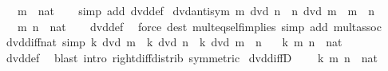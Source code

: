 \begin{isabellebody}
\ \ \ m\ {\isacharcolon}{\kern0pt}{\isacharcolon}{\kern0pt}\ nat\isanewline
%
\isadelimproof
\ \ %
\endisadelimproof
%
\isatagproof
{}\isamarkupfalse%
\ {\isacharparenleft}{\kern0pt}simp\ add{\isacharcolon}{\kern0pt}\ dvd{\isacharunderscore}{\kern0pt}def{\isacharparenright}{\kern0pt}%
\endisatagproof
{\isafoldproof}%
%
\isadelimproof
\isanewline
%
\endisadelimproof
\isanewline
{}\isamarkupfalse%
\ dvd{\isacharunderscore}{\kern0pt}antisym{\isacharcolon}{\kern0pt}\ {\isachardoublequoteopen}m\ dvd\ n\ {\isasymLongrightarrow}\ n\ dvd\ m\ {\isasymLongrightarrow}\ m\ {\isacharequal}{\kern0pt}\ n{\isachardoublequoteclose}\isanewline
\ \ \ m\ n\ {\isacharcolon}{\kern0pt}{\isacharcolon}{\kern0pt}\ nat\isanewline
%
\isadelimproof
\ \ %
\endisadelimproof
%
\isatagproof
{}\isamarkupfalse%
\ dvd{\isacharunderscore}{\kern0pt}def\ \isamarkupfalse%
\ {\isacharparenleft}{\kern0pt}force\ dest{\isacharcolon}{\kern0pt}\ mult{\isacharunderscore}{\kern0pt}eq{\isacharunderscore}{\kern0pt}self{\isacharunderscore}{\kern0pt}implies{\isacharunderscore}{\kern0pt}{}{}\ simp\ add{\isacharcolon}{\kern0pt}\ mult{\isachardot}{\kern0pt}assoc{\isacharparenright}{\kern0pt}%
\endisatagproof
{\isafoldproof}%
%
\isadelimproof
\isanewline
%
\endisadelimproof
\isanewline
{}\isamarkupfalse%
\ dvd{\isacharunderscore}{\kern0pt}diff{\isacharunderscore}{\kern0pt}nat\ {\isacharbrackleft}{\kern0pt}simp{\isacharbrackright}{\kern0pt}{\isacharcolon}{\kern0pt}\ {\isachardoublequoteopen}k\ dvd\ m\ {\isasymLongrightarrow}\ k\ dvd\ n\ {\isasymLongrightarrow}\ k\ dvd\ {\isacharparenleft}{\kern0pt}m\ {\isacharminus}{\kern0pt}\ n{\isacharparenright}{\kern0pt}{\isachardoublequoteclose}\isanewline
\ \ \ k\ m\ n\ {\isacharcolon}{\kern0pt}{\isacharcolon}{\kern0pt}\ nat\isanewline
%
\isadelimproof
\ \ %
\endisadelimproof
%
\isatagproof
{}\isamarkupfalse%
\ dvd{\isacharunderscore}{\kern0pt}def\ \isamarkupfalse%
\ {\isacharparenleft}{\kern0pt}blast\ intro{\isacharcolon}{\kern0pt}\ right{\isacharunderscore}{\kern0pt}diff{\isacharunderscore}{\kern0pt}distrib{\isacharprime}{\kern0pt}\ {\isacharbrackleft}{\kern0pt}symmetric{\isacharbrackright}{\kern0pt}{\isacharparenright}{\kern0pt}%
\endisatagproof
{\isafoldproof}%
%
\isadelimproof
\isanewline
%
\endisadelimproof
\isanewline
{}\isamarkupfalse%
\ dvd{\isacharunderscore}{\kern0pt}diffD{\isacharcolon}{\kern0pt}\ \isanewline
\ \ \ k\ m\ n\ {\isacharcolon}{\kern0pt}{\isacharcolon}{\kern0pt}\ nat\isanewline

\end{isabellebody}
